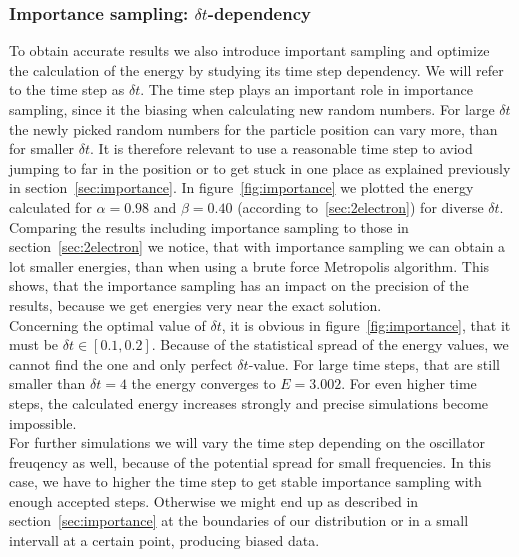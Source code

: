\subsubsection{Importance sampling: $\delta t$-dependency}
To obtain accurate results we also introduce important sampling and optimize the calculation of the energy by studying its time step dependency. We will refer to the time step as $\delta t$. The time step plays an important role in importance sampling, since it the biasing when calculating new random numbers. For large $\delta t$ the newly picked random numbers for the particle position can vary more, than for smaller $\delta t$. It is therefore relevant to use a reasonable time step to aviod jumping to far in the position or to get stuck in one place as explained previously in section~\ref{sec:importance}. In figure~\ref{fig:importance} we plotted the energy calculated for $\alpha = 0.98$ and $\beta = 0.40$ (according to~\ref{sec:2electron}) for diverse $\delta t$. Comparing the results including importance sampling to those in section~\ref{sec:2electron} we notice, that with importance sampling we can obtain a lot smaller energies, than when using a brute force Metropolis algorithm. This shows, that the importance sampling has an impact on the precision of the results, because we get energies very near the exact solution.\\
Concerning the optimal value of $\delta t$, it is obvious in figure~\ref{fig:importance}, that it must be $\delta t \in [0.1,0.2]$. Because of the statistical spread of the energy values, we cannot find the one and only perfect $\delta t$-value. For large time steps, that are still smaller than $\delta t= 4$ the energy converges to $E=3.002$. For even higher time steps, the calculated energy increases strongly and precise simulations become impossible.\\
For further simulations we will vary the time step depending on the oscillator freuqency as well, because of the potential spread for small frequencies. In this case, we have to higher the time step to get stable importance sampling with enough accepted steps. Otherwise we might end up as described in section~\ref{sec:importance} at the boundaries of our distribution or in a small intervall at a certain point, producing biased data.
